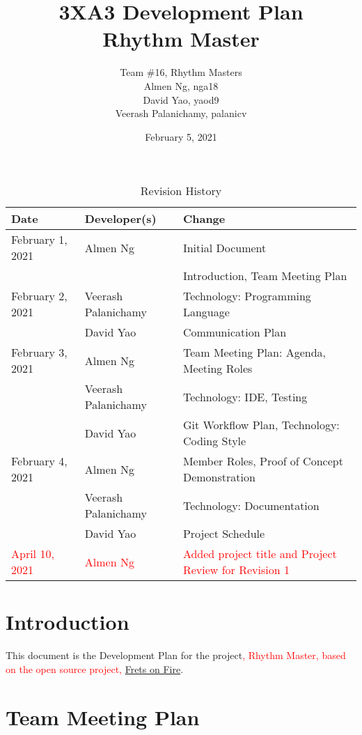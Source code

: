 \documentclass[12pt,letterpaper]{article}
\title{3XA3 Development Plan\\ Rhythm Master}
\author{Team \#16, Rhythm Masters
    \\ Almen Ng, nga18
    \\ David Yao, yaod9
    \\ Veerash Palanichamy, palanicv}
\date{February 5, 2021}
\begin{document}
\sloppy
\maketitle
\newpage

\begin{table}[hp]
\caption{Revision History} \label{TblRevisionHistory}
\begin{tabularx}{\textwidth}{llX}
\toprule
\textbf{Date} & \textbf{Developer(s)} & \textbf{Change}\\
\midrule
February 1, 2021    & Almen Ng              & Initial Document\\
                    &                       & Introduction, Team Meeting Plan\\
February 2, 2021    & Veerash Palanichamy   & Technology: Programming Language\\
                    & David Yao             & Communication Plan\\
February 3, 2021    & Almen Ng              & Team Meeting Plan: Agenda, Meeting Roles\\
                    & Veerash Palanichamy   & Technology: IDE, Testing\\
                    & David Yao             & Git Workflow Plan, Technology: Coding Style\\
February 4, 2021    & Almen Ng              & Member Roles, Proof of Concept Demonstration\\
                    & Veerash Palanichamy   & Technology: Documentation\\
                    & David Yao             & Project Schedule\\
\textcolor{red}{April 10, 2021}    & \textcolor{red}{Almen Ng}  & \textcolor{red}{Added project title and Project Review for Revision 1}\\
\bottomrule
\end{tabularx}
\end{table}

\newpage
\tableofcontents

\newpage
\listoftables

\newpage
\section{Introduction}
This document is the Development Plan for the project\textcolor{red}{, Rhythm Master, based on the open source project,} \href{https://github.com/skyostil/fretsonfire}{Frets on Fire}.

\section{Team Meeting Plan}
\end{document}
